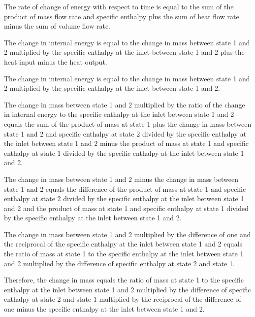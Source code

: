 The rate of change of energy with respect to time is equal to the sum of the product of mass flow rate and specific enthalpy plus the sum of heat flow rate minus the sum of volume flow rate.

The change in internal energy is equal to the change in mass between state 1 and 2 multiplied by the specific enthalpy at the inlet between state 1 and 2 plus the heat input minus the heat output.

The change in internal energy is equal to the change in mass between state 1 and 2 multiplied by the specific enthalpy at the inlet between state 1 and 2.

The change in mass between state 1 and 2 multiplied by the ratio of the change in internal energy to the specific enthalpy at the inlet between state 1 and 2 equals the sum of the product of mass at state 1 plus the change in mass between state 1 and 2 and specific enthalpy at state 2 divided by the specific enthalpy at the inlet between state 1 and 2 minus the product of mass at state 1 and specific enthalpy at state 1 divided by the specific enthalpy at the inlet between state 1 and 2.

The change in mass between state 1 and 2 minus the change in mass between state 1 and 2 equals the difference of the product of mass at state 1 and specific enthalpy at state 2 divided by the specific enthalpy at the inlet between state 1 and 2 and the product of mass at state 1 and specific enthalpy at state 1 divided by the specific enthalpy at the inlet between state 1 and 2.

The change in mass between state 1 and 2 multiplied by the difference of one and the reciprocal of the specific enthalpy at the inlet between state 1 and 2 equals the ratio of mass at state 1 to the specific enthalpy at the inlet between state 1 and 2 multiplied by the difference of specific enthalpy at state 2 and state 1.

Therefore, the change in mass equals the ratio of mass at state 1 to the specific enthalpy at the inlet between state 1 and 2 multiplied by the difference of specific enthalpy at state 2 and state 1 multiplied by the reciprocal of the difference of one minus the specific enthalpy at the inlet between state 1 and 2.